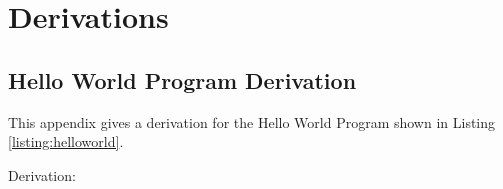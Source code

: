 \documentclass[12pt,twoside]{report}
\begin{document}





\section{Derivations}
\subsection{Hello World Program Derivation}
\label{appendix:helloworldderivation}
This appendix gives a derivation for the Hello World Program shown in Listing \ref{listing:helloworld}.

Derivation:
\end{document}
